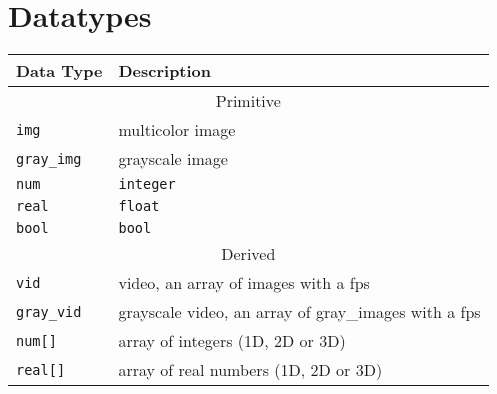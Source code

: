 \documentclass[a4paper, 11pt]{article}
\begin{document}
\section{Datatypes}
\begin{tabular}{ |p{3cm}|p{10cm}|  }
  \hline
  Data Type & Description\\
  \hline
  \multicolumn{2}{|c|}{Primitive} \\
  \hline
  \texttt{img} & multicolor image \\
  \texttt{gray\_img} & grayscale image \\
  \texttt{num} & \texttt{integer}\\
  \texttt{real} & \texttt{float}\\
  \texttt{bool} & \texttt{bool}\\
  \hline
  \multicolumn{2}{|c|}{Derived} \\
  \hline
  \texttt{vid} & video, an array of images with a fps\\
  \texttt{gray\_vid} & grayscale video, an array of gray\_images with a fps\\
  \texttt{num[]} & array of integers (1D, 2D or 3D)\\
  \texttt{real[]} & array of real numbers (1D, 2D or 3D)\\
  \hline
 \end{tabular}
\end{document}
